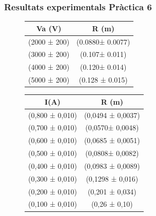 \documentclass[11pt]{article}
\numberwithin{equation}{section}
\numberwithin{figure}{section}
\numberwithin{table}{section}
\begin{document}
\subsubsection{Resultats experimentals Pràctica 6}
\begin{figure}[h]
    \centering
    \begin{minipage}{0.45\textwidth}
        \centering
        \begin{tabular}{|c|c|}
            \hline
            Va (V)	&	R (m)	\\\hline
            (2000 ± 200)	&	(0.0880± 0.0077)	\\\hline
            (3000 ± 200)	&	(0.107± 0.011)	\\\hline
            (4000 ± 200)	&	(0.120± 0.014)	\\\hline
            (5000 ± 200)	&	(0.128 ± 0.015)	\\\hline
            
        \end{tabular}
        
        \label{tab:RvsVa}
    \end{minipage}
    \hfill
    \begin{minipage}{0.45\textwidth} 
        \centering
        \begin{tabular}{|c|c|}
            \hline
            I(A)	&	R (m)	\\\hline
            (0,800 ± 0,010)	&	(0,0494 ± 0,0037)	\\\hline
            (0,700 ± 0,010)	&	(0,0570± 0,0048)	\\\hline
            (0,600 ± 0,010)	&	(0,0685 ± 0,0051)	\\\hline
            (0,500 ± 0,010)	&	(0,0808± 0,0082)	\\\hline
            (0,400 ± 0,010)	&	(0,0983 ± 0,0089)	\\\hline
            (0,300 ± 0,010)	&	(0,1298 ± 0,016)	\\\hline
            (0,200 ± 0,010)	&	(0,201 ± 0,034)	\\\hline
            (0,100 ± 0,010)	&	(0,26 ± 0,10)	\\\hline
            
        \end{tabular}
        
        \label{tab:RvsI}
    \end{minipage}
\end{figure}
\end{document}
